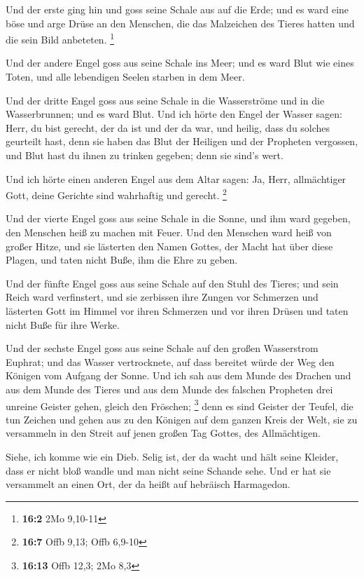  Und der erste ging hin und goss seine Schale aus auf die
Erde; und es ward eine böse und arge Drüse an den Menschen, die das
Malzeichen des Tieres hatten und die sein Bild anbeteten. \footnote{\textbf{16:2}
  2Mo 9,10-11}

 Und der andere Engel goss aus seine Schale ins Meer; und es
ward Blut wie eines Toten, und alle lebendigen Seelen starben in dem
Meer.

 Und der dritte Engel goss aus seine Schale in die
Wasserströme und in die Wasserbrunnen; und es ward Blut. 
Und ich hörte den Engel der Wasser sagen: Herr, du bist gerecht, der da
ist und der da war, und heilig, dass du solches geurteilt hast,
 denn sie haben das Blut der Heiligen und der Propheten
vergossen, und Blut hast du ihnen zu trinken gegeben; denn sie sind's
wert.

 Und ich hörte einen anderen Engel aus dem Altar sagen: Ja,
Herr, allmächtiger Gott, deine Gerichte sind wahrhaftig und gerecht.
\footnote{\textbf{16:7} Offb 9,13; Offb 6,9-10}

 Und der vierte Engel goss aus seine Schale in die Sonne,
und ihm ward gegeben, den Menschen heiß zu machen mit Feuer.
 Und den Menschen ward heiß von großer Hitze, und sie
lästerten den Namen Gottes, der Macht hat über diese Plagen, und taten
nicht Buße, ihm die Ehre zu geben.

 Und der fünfte Engel goss aus seine Schale auf den Stuhl
des Tieres; und sein Reich ward verfinstert, und sie zerbissen ihre
Zungen vor Schmerzen  und lästerten Gott im Himmel vor
ihren Schmerzen und vor ihren Drüsen und taten nicht Buße für ihre
Werke.

 Und der sechste Engel goss aus seine Schale auf den großen
Wasserstrom Euphrat; und das Wasser vertrocknete, auf dass bereitet
würde der Weg den Königen vom Aufgang der Sonne.  Und ich
sah aus dem Munde des Drachen und aus dem Munde des Tieres und aus dem
Munde des falschen Propheten drei unreine Geister gehen, gleich den
Fröschen; \footnote{\textbf{16:13} Offb 12,3; 2Mo 8,3} 
denn es sind Geister der Teufel, die tun Zeichen und gehen aus zu den
Königen auf dem ganzen Kreis der Welt, sie zu versammeln in den Streit
auf jenen großen Tag Gottes, des Allmächtigen.

 Siehe, ich komme wie ein Dieb. Selig ist, der da wacht und
hält seine Kleider, dass er nicht bloß wandle und man nicht seine
Schande sehe.  Und er hat sie versammelt an einen Ort, der
da heißt auf hebräisch Harmagedon.

